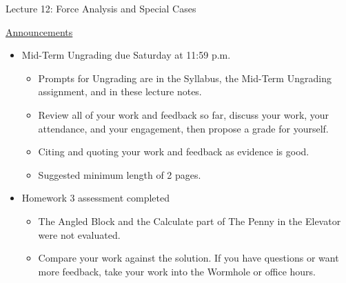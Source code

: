\documentclass[]{article}
\newcommand{\Week}{12}
\begin{document}
\begin{PresentSpace}
\begin{center}
	\huge Lecture \Week: Force Analysis and Special Cases
\end{center}
\vspace{0.5cm}
\underline{Announcements}
\begin{itemize}
	\item Mid-Term Ungrading due Saturday at 11:59 p.m.
	\begin{itemize}
		\item Prompts for Ungrading are in the Syllabus, the Mid-Term Ungrading assignment, and in these lecture notes.
		\item Review all of your work and feedback so far, discuss your work, your attendance, and your engagement, then propose a grade for yourself.
		\item Citing and quoting your work and feedback as evidence is good.
		\item Suggested minimum length of 2 pages.
	\end{itemize}
	\item Homework 3 assessment completed
	\begin{itemize}
		\item The Angled Block and the Calculate part of The Penny in the Elevator were not evaluated.
		\item Compare your work against the solution. If you have questions or want more feedback, take your work into the Wormhole or office hours.
	\end{itemize}
\end{itemize}
\end{PresentSpace}
\newpage
\begin{TeacherMargin}

\end{TeacherMargin}
\end{document}
